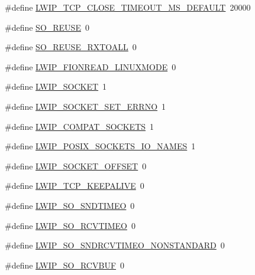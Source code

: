 \begin{DoxyCompactItemize}
\#define \hyperlink{group__lwip__opts__socket_ga3e7498d5d2921f0df3792de72f384d36}{L\+W\+I\+P\+\_\+\+T\+C\+P\+\_\+\+C\+L\+O\+S\+E\+\_\+\+T\+I\+M\+E\+O\+U\+T\+\_\+\+M\+S\+\_\+\+D\+E\+F\+A\+U\+LT}~20000
\item 
\#define \hyperlink{group__lwip__opts__socket_gaf3822feed320cf8439b083ee525e4942}{S\+O\+\_\+\+R\+E\+U\+SE}~0
\item 
\#define \hyperlink{group__lwip__opts__socket_gae9395d83af89002343e5782130f52f44}{S\+O\+\_\+\+R\+E\+U\+S\+E\+\_\+\+R\+X\+T\+O\+A\+LL}~0
\item 
\#define \hyperlink{group__lwip__opts__socket_ga0543eea2abe390d0bdc843c33debd762}{L\+W\+I\+P\+\_\+\+F\+I\+O\+N\+R\+E\+A\+D\+\_\+\+L\+I\+N\+U\+X\+M\+O\+DE}~0
\item 
\#define \hyperlink{group__lwip__opts__socket_ga1cb62ce61ac39d7d6728ae5d3d3b927f}{L\+W\+I\+P\+\_\+\+S\+O\+C\+K\+ET}~1
\item 
\#define \hyperlink{group__lwip__opts__socket_ga7222c197f4ad4eb4f6c96bec865297a8}{L\+W\+I\+P\+\_\+\+S\+O\+C\+K\+E\+T\+\_\+\+S\+E\+T\+\_\+\+E\+R\+R\+NO}~1
\item 
\#define \hyperlink{group__lwip__opts__socket_gafed2811f031822ec5afa1ee211fb7447}{L\+W\+I\+P\+\_\+\+C\+O\+M\+P\+A\+T\+\_\+\+S\+O\+C\+K\+E\+TS}~1
\item 
\#define \hyperlink{group__lwip__opts__socket_ga484c38ab08f60d5b3335d23d31f9a402}{L\+W\+I\+P\+\_\+\+P\+O\+S\+I\+X\+\_\+\+S\+O\+C\+K\+E\+T\+S\+\_\+\+I\+O\+\_\+\+N\+A\+M\+ES}~1
\item 
\#define \hyperlink{group__lwip__opts__socket_gad0197c845fbb44c920b272f0fef3b57e}{L\+W\+I\+P\+\_\+\+S\+O\+C\+K\+E\+T\+\_\+\+O\+F\+F\+S\+ET}~0
\item 
\#define \hyperlink{group__lwip__opts__socket_ga8b9369ab260f032686a81c77c5b4db77}{L\+W\+I\+P\+\_\+\+T\+C\+P\+\_\+\+K\+E\+E\+P\+A\+L\+I\+VE}~0
\item 
\#define \hyperlink{group__lwip__opts__socket_ga1162cb685f202d9b21c11344b8209a58}{L\+W\+I\+P\+\_\+\+S\+O\+\_\+\+S\+N\+D\+T\+I\+M\+EO}~0
\item 
\#define \hyperlink{group__lwip__opts__socket_ga91af3ade95b20b9a60c65ed0380fa0ed}{L\+W\+I\+P\+\_\+\+S\+O\+\_\+\+R\+C\+V\+T\+I\+M\+EO}~0
\item 
\#define \hyperlink{group__lwip__opts__socket_ga5b115bacb569763d8a3889a12229e942}{L\+W\+I\+P\+\_\+\+S\+O\+\_\+\+S\+N\+D\+R\+C\+V\+T\+I\+M\+E\+O\+\_\+\+N\+O\+N\+S\+T\+A\+N\+D\+A\+RD}~0
\item 
\#define \hyperlink{group__lwip__opts__socket_ga06390cebcf4d13d3d47a11365e5fcd28}{L\+W\+I\+P\+\_\+\+S\+O\+\_\+\+R\+C\+V\+B\+UF}~0

\end{DoxyCompactItemize}
